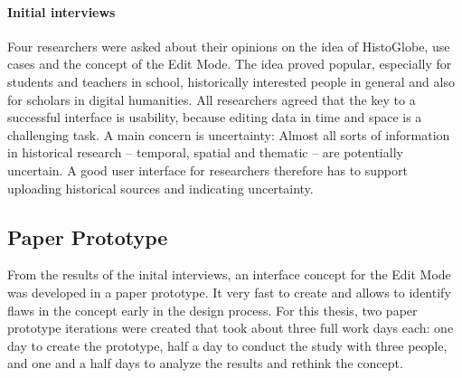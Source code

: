 \paragraph{Initial interviews} %
\label{par:initial_interviews}

Four researchers were asked about their opinions on the idea of HistoGlobe, use cases and the concept of the Edit Mode. The idea proved popular, especially for students and teachers in school, historically interested people in general and also for scholars in digital humanities. All researchers agreed that the key to a successful interface is usability, because editing data in time and space is a challenging task. A main concern is uncertainty: Almost all sorts of information in historical research -- temporal, spatial and thematic -- are potentially uncertain. A good user interface for researchers therefore has to support uploading historical sources and indicating uncertainty.



\subsection{Paper Prototype} %
\label{sub:paper_prototype}

From the results of the inital interviews, an interface concept for the Edit Mode was developed in a paper prototype. It very fast to create and allows to identify flaws in the concept early in the design process. For this thesis, two paper prototype iterations were created that took about three full work days each: one day to create the prototype, half a day to conduct the study with three people, and one and a half days to analyze the results and rethink the concept.


